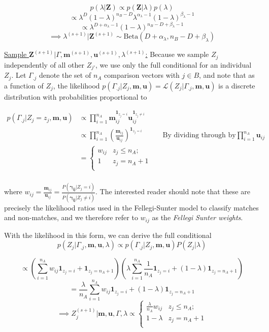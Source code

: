 \documentclass[
  12pt,
]{article}
\begin{document}
\[p(\lambda | \mathbf{Z}) \propto p(\mathbf{Z}|\lambda)p(\lambda)\]
\[\propto \lambda^D (1-\lambda)^{n_B - D} \lambda^{\alpha_{\lambda} -1} (1-\lambda)^{\beta_{\lambda} -1}\]
\[ \propto \lambda^{D + \alpha_{\lambda} - 1} (1-\lambda)^{n_B - D + \beta_{\lambda} -1}\]
\[\implies \lambda^{(s+1)}|\mathbf{Z}^{(s+1)} \sim \text{Beta}(D + \alpha_{\lambda}, n_B - D + \beta_{\lambda})\]

\underline{Sample $\mathbf{Z}^{(s+1)}|\Gamma, \mathbf{m}^{(s+1)}, \mathbf{u}^{(s+1)}, \lambda^{(s+1)}$:}
Because we sample \(Z_j\) independently of all other \(Z_{j'}\), we use
only the full conditional for an individual \(Z_j\). Let \(\Gamma_{.j}\)
denote the set of \(n_A\) comparison vectors with \(j \in B\), and note
that as a function of \(Z_j\), the likelihood
\(p(\Gamma_{.j}|Z_j, \mathbf{m}, \mathbf{u}) = \mathcal{L}(Z_j|\Gamma_{.j}, \mathbf{m}, \mathbf{u})\)
is a discrete distribution with probabilities proportional to

\begin{align*}
p(\Gamma_{.j}|Z_j = z_j, \mathbf{m}, \mathbf{u}) &\propto \prod_{i=1}^{n_A}\mathbf{m}_{ij}^{\mathbf{1}_{z_j = i}}\mathbf{u}_{ij}^{\mathbf{1}_{z_j \neq i}}\\
&\propto \prod_{i=1}^{n_A}\left(\frac{\mathbf{m}_{ij}}{\mathbf{u}_{ij}}\right)^{\mathbf{1}_{z_j = i}} && \text{By dividing through by} \prod_{i = 1}^{n_A}\mathbf{u}_{ij}\\
&=
\begin{cases} 
    w_{ij}  & z_j \leq n_A; \\
    1 &  z_j  = n_A + 1 \\
\end{cases}\\
\end{align*}

where
\(w_{ij} = \frac{\mathbf{m}_{ij}}{\mathbf{u}_{ij}} = \frac{P(\boldsymbol{\gamma_{ij}}|Z_j = i)}{P(\boldsymbol{\gamma_{ij}} |Z_j \neq i)}\).
The interested reader should note that these are precisely the
likelihood ratios used in the Fellegi-Sunter model to classify matches
and non-matches, and we therefore refer to \(w_{ij}\) as the
\emph{Fellegi Sunter weights}.

With the likelihood in this form, we can derive the full conditional
\[p(Z_j|\Gamma_{.j}, \mathbf{m} ,\mathbf{u}, \lambda) \propto p(\Gamma_{.j}| Z_j, \mathbf{m} ,\mathbf{u}) P(Z_j|\lambda)\]

\[\propto \left(\sum_{i=1}^{n_A}w_{ij}\mathbf{1}_{z_j = i} + \mathbf{1}_{z_j = n_A + 1}\right)\left(\lambda\sum_{i=1}^{n_A}\frac{1}{n_A}\mathbf{1}_{z_j = i} + (1-\lambda)\mathbf{1}_{z_j = n_A + 1}\right)\]
\[= \frac{\lambda}{n_A}\sum_{i=1}^{n_A}w_{ij}\mathbf{1}_{z_j = i} + (1-\lambda)\mathbf{1}_{z_j = n_A + 1} \]
\[ \implies Z_j^{(s+1)} | \mathbf{m}, \mathbf{u}, \Gamma, \lambda \propto
\begin{cases} 
    \frac{\lambda}{n_A}w_{ij}   & z_j \leq n_A; \\
     1-\lambda &  z_j  = n_A + 1 \\
\end{cases}\]
\end{document}
